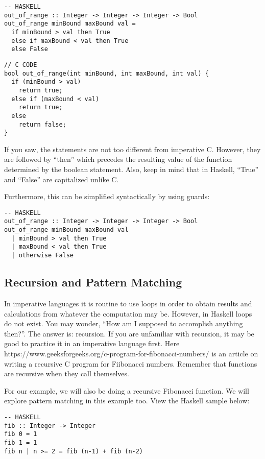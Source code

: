 \documentclass{article}
\begin{document}
\begin{lstlisting}[style=HaskellStyle]
-- HASKELL
out_of_range :: Integer -> Integer -> Integer -> Bool
out_of_range minBound maxBound val =
  if minBound > val then True
  else if maxBound < val then True
  else False
\end{lstlisting}

\begin{lstlisting}[style=CStyle]
// C CODE
bool out_of_range(int minBound, int maxBound, int val) {
  if (minBound > val)
    return true;
  else if (maxBound < val)
    return true;
  else 
    return false;
}
\end{lstlisting}

\medskip\noindent
If you saw, the statements are not too different from imperative C. However, they are followed by “then” which precedes the resulting value of the function determined by the boolean statement. Also, keep in mind that in Haskell, “True” and “False” are capitalized unlike C.

\medskip\noindent
Furthermore, this can be simplified syntactically by using guards:

\begin{lstlisting}[style=HaskellStyle]
-- HASKELL
out_of_range :: Integer -> Integer -> Integer -> Bool
out_of_range minBound maxBound val
  | minBound > val then True
  | maxBound < val then True
  | otherwise False
\end{lstlisting}

\subsection{Recursion and Pattern Matching}
\medskip\noindent
In imperative languages it is routine to use loops in order to obtain results and calculations from whatever the computation may be. However, in Haskell loops do not exist. You may wonder, “How am I supposed to accomplish anything then?”. The answer is: recursion. If you are unfamiliar with recursion, it may be good to practice it in an imperative language first. Here https://www.geeksforgeeks.org/c-program-for-fibonacci-numbers/ is an article on writing a recursive C program for Fiibonacci numbers. Remember that functions are recursive when they call themselves.

\medskip\noindent
For our example, we will also be doing a recursive Fibonacci function. We will explore pattern matching in this example too. View the Haskell sample below:

\begin{lstlisting}[style=HaskellStyle]
-- HASKELL
fib :: Integer -> Integer
fib 0 = 1
fib 1 = 1
fib n | n >= 2 = fib (n-1) + fib (n-2)
\end{lstlisting}
\end{document}
